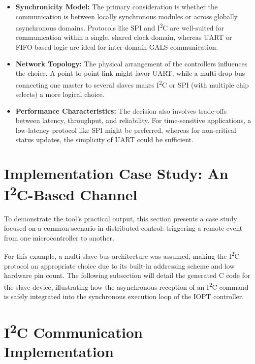 \begin{itemize}
    \item \textbf{Synchronicity Model:} The primary consideration is whether the communication is between locally synchronous modules or across globally asynchronous domains. Protocols like SPI and I\textsuperscript{2}C are well-suited for communication within a single, shared clock domain, whereas UART or FIFO-based logic are ideal for inter-domain GALS communication.
    \item \textbf{Network Topology:} The physical arrangement of the controllers influences the choice. A point-to-point link might favor UART, while a multi-drop bus connecting one master to several slaves makes I\textsuperscript{2}C or SPI (with multiple chip selects) a more logical choice.
    \item \textbf{Performance Characteristics:} The decision also involves trade-offs between latency, throughput, and reliability. For time-sensitive applications, a low-latency protocol like SPI might be preferred, whereas for non-critical status updates, the simplicity of UART could be sufficient.
\end{itemize}

\section{Implementation Case Study: An I\textsuperscript{2}C-Based Channel}
\label{sec:case_study_i2c}

To demonstrate the tool's practical output, this section presents a case study focused on a common scenario in distributed control: triggering a remote event from one microcontroller to another.

For this example, a multi-slave bus architecture was assumed, making the I\textsuperscript{2}C protocol an appropriate choice due to its built-in addressing scheme and low hardware pin count. The following subsection will detail the generated C code for the slave device, illustrating how the asynchronous reception of an I\textsuperscript{2}C command is safely integrated into the synchronous execution loop of the IOPT controller.



\section{I\textsuperscript{2}C Communication Implementation}
\label{sec:i2c_implementation}

